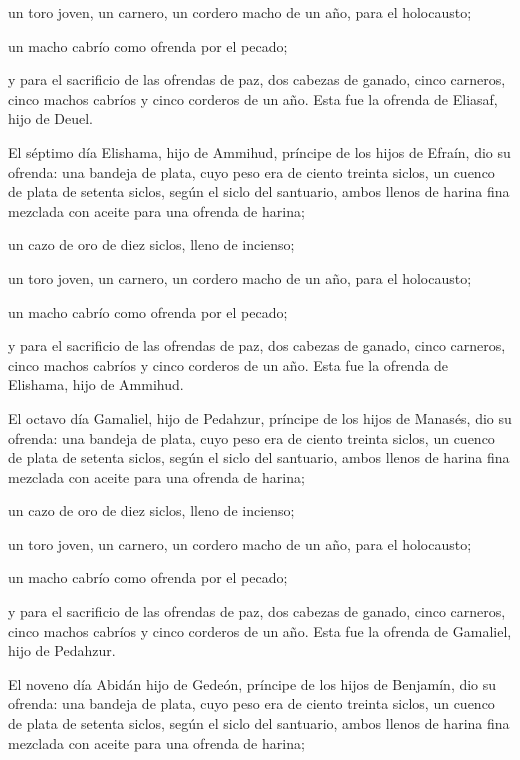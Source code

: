  un toro joven, un carnero, un cordero macho de un año,
para el holocausto;

 un macho cabrío como ofrenda por el pecado;

 y para el sacrificio de las ofrendas de paz, dos cabezas
de ganado, cinco carneros, cinco machos cabríos y cinco corderos de un
año. Esta fue la ofrenda de Eliasaf, hijo de Deuel.

 El séptimo día Elishama, hijo de Ammihud, príncipe de
los hijos de Efraín,  dio su ofrenda: una bandeja de
plata, cuyo peso era de ciento treinta siclos, un cuenco de plata de
setenta siclos, según el siclo del santuario, ambos llenos de harina
fina mezclada con aceite para una ofrenda de harina;

 un cazo de oro de diez siclos, lleno de incienso;

 un toro joven, un carnero, un cordero macho de un año,
para el holocausto;

 un macho cabrío como ofrenda por el pecado;

 y para el sacrificio de las ofrendas de paz, dos cabezas
de ganado, cinco carneros, cinco machos cabríos y cinco corderos de un
año. Esta fue la ofrenda de Elishama, hijo de Ammihud.

 El octavo día Gamaliel, hijo de Pedahzur, príncipe de
los hijos de Manasés,  dio su ofrenda: una bandeja de
plata, cuyo peso era de ciento treinta siclos, un cuenco de plata de
setenta siclos, según el siclo del santuario, ambos llenos de harina
fina mezclada con aceite para una ofrenda de harina;

 un cazo de oro de diez siclos, lleno de incienso;

 un toro joven, un carnero, un cordero macho de un año,
para el holocausto;

 un macho cabrío como ofrenda por el pecado;

 y para el sacrificio de las ofrendas de paz, dos cabezas
de ganado, cinco carneros, cinco machos cabríos y cinco corderos de un
año. Esta fue la ofrenda de Gamaliel, hijo de Pedahzur.

 El noveno día Abidán hijo de Gedeón, príncipe de los
hijos de Benjamín,  dio su ofrenda: una bandeja de plata,
cuyo peso era de ciento treinta siclos, un cuenco de plata de setenta
siclos, según el siclo del santuario, ambos llenos de harina fina
mezclada con aceite para una ofrenda de harina;

